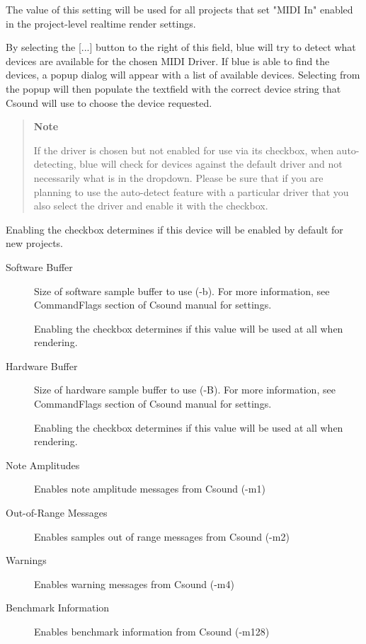 \begin{description}
The value of this setting will be used for all projects that set "MIDI
In" enabled in the project-level realtime render settings.

By selecting the {[}...{]} button to the right of this field, blue will
try to detect what devices are available for the chosen MIDI Driver. If
blue is able to find the devices, a popup dialog will appear with a list
of available devices. Selecting from the popup will then populate the
textfield with the correct device string that Csound will use to choose
the device requested.

\begin{quote}
\textbf{Note}

If the driver is chosen but not enabled for use via its checkbox, when
auto-detecting, blue will check for devices against the default driver
and not necessarily what is in the dropdown. Please be sure that if you
are planning to use the auto-detect feature with a particular driver
that you also select the driver and enable it with the checkbox.
\end{quote}

Enabling the checkbox determines if this device will be enabled by
default for new projects.
\end{description}

\begin{description}
\item[Software Buffer]
Size of software sample buffer to use (-b). For more information, see
CommandFlags section of Csound manual for settings.

Enabling the checkbox determines if this value will be used at all when
rendering.
\item[Hardware Buffer]
Size of hardware sample buffer to use (-B). For more information, see
CommandFlags section of Csound manual for settings.

Enabling the checkbox determines if this value will be used at all when
rendering.
\end{description}

\begin{description}
\item[Note Amplitudes]
Enables note amplitude messages from Csound (-m1)
\item[Out-of-Range Messages]
Enables samples out of range messages from Csound (-m2)
\item[Warnings]
Enables warning messages from Csound (-m4)
\item[Benchmark Information]
Enables benchmark information from Csound (-m128)
\end{description}

